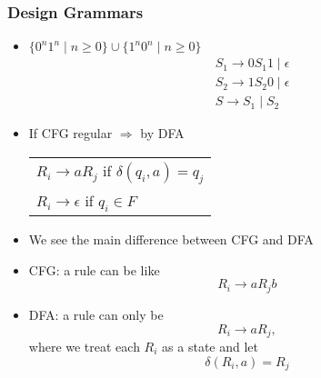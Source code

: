 \begin{frame}[allowframebreaks]
\begin{itemize}
\end{itemize}\end{frame} \begin{frame}[allowframebreaks] \frametitle{Design Grammars}
  \begin{itemize}
\item $\{0^n 1^n \mid n\geq 0\}
\cup \{1^n 0^n \mid n \geq 0\}$
\begin{equation*}
  \begin{split}
& S_1 \rightarrow 0 S_1 1 \mid \epsilon \\
& S_2 \rightarrow 1 S_2 0 \mid \epsilon \\
& S \rightarrow S_1 \mid S_2
\end{split}
\end{equation*}
\item If CFG regular $\Rightarrow $
by DFA

\begin{center}
  \begin{tabular}{l}
$R_i \rightarrow a R_j$ if $\delta(q_i,a)
= q_j$ \\
$R_i \rightarrow \epsilon$ if $q_i \in F$
  \end{tabular}
\end{center}
\item We see the main difference between CFG and DFA

  
\item [] CFG: a rule can be like
  \begin{equation*}
  R_i \rightarrow a R_j b
\end{equation*}
\item [] DFA: a rule can only be
  \begin{equation*}
  R_i \rightarrow a R_j,
\end{equation*}
where we treat each $R_i$ as a state and let
\begin{equation*}
  \delta(R_i, a) = R_j
\end{equation*}


\end{itemize}
\end{frame}
